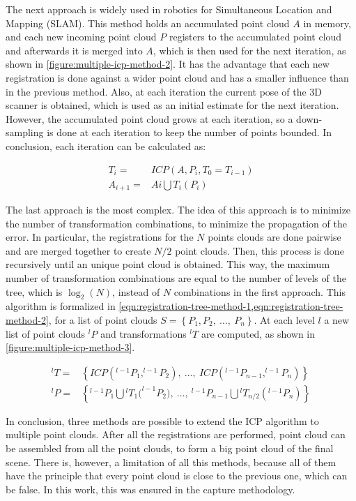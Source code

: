 The next approach is widely used in robotics for Simultaneous Location and Mapping (SLAM). This method holds an accumulated point cloud $A$ in memory, and each new incoming point cloud $P$ registers to the accumulated point cloud and afterwards it is merged into $A$, which is then used for the next iteration, as shown in \cref{figure:multiple-icp-method-2}. It has the advantage that each new registration is done against a wider point cloud and has a smaller influence than in the previous method. Also, at each iteration the current pose of the 3D scanner is obtained, which is used as an initial estimate for the next iteration. However, the accumulated point cloud grows at each iteration, so a down-sampling is done at each iteration to keep the number of points bounded. In conclusion, each iteration can be calculated as:

\begin{align}
    T_{i} = & ICP(A, P_{i}, T_0 = T_{i-1}) \\
    A_{i+1} = & A{i} \bigcup T_{i}(P_i)
\end{align}

The last approach is the most complex. The idea of this approach is to minimize the number of transformation combinations, to minimize the propagation of the error. In particular, the registrations for the $N$ points clouds are done pairwise and are merged together to create $N/2$ point clouds. Then, this process is done recursively until an unique point cloud is obtained. This way, the maximum number of transformation combinations are equal to the number of levels of the tree, which is $\log_2(N)$, instead of $N$ combinations in the first approach. This algorithm is formalized in \cref{eqn:registration-tree-method-1,eqn:registration-tree-method-2}, for a list of point clouds $S=\left\{P_1, P_2, \ \dots, \ P_n\right\}$. At each level $l$ a new list of point clouds $^{l}P$ and transformations $^{l}T$ are computed, as shown in \cref{figure:multiple-icp-method-3}.

\begin{align}
    ^{l}T = & \left\{ICP(^{l-1}P_1, ^{l-1}P_2), \ \dots, \ ICP(^{l-1}P_{n-1}, ^{l-1}P_{n}) \right\}
        \label{eqn:registration-tree-method-1} \\
    ^{l}P = & \left\{^{l-1}P_1 \bigcup{^{l}T_1(^{l-1}P_2}), \ \dots, \ ^{l-1}P_{n-1} \bigcup{^{l}T_{n/2}(^{l-1}P_n)}\right\}
        \label{eqn:registration-tree-method-2}
\end{align}

In conclusion, three methods are possible to extend the ICP algorithm to multiple point clouds. After all the registrations are performed, point cloud can be assembled from all the point clouds, to form a big point cloud of the final scene. There is, however, a limitation of all this methods, because all of them have the principle that every point cloud is close to the previous one, which can be false. In this work, this was ensured in the capture methodology. 

